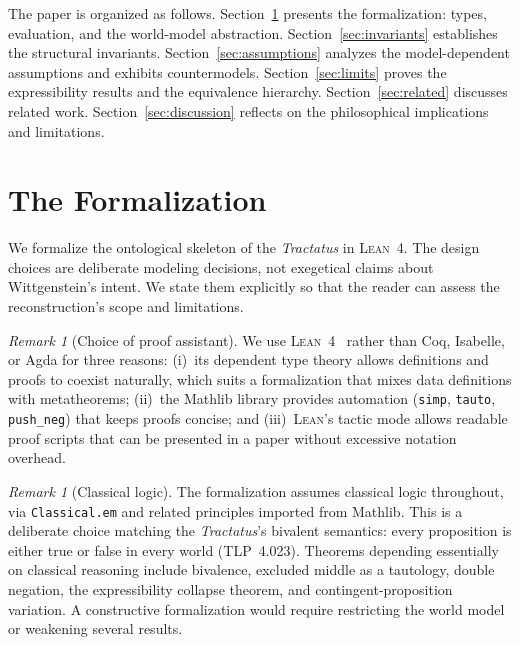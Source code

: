 \documentclass[10pt, letterpaper]{article}
\theoremstyle{definition}
\theoremstyle{remark}
\newtheorem{remark}[theorem]{Remark}
\newcommand{\Lean}{\textsc{Lean}}
\begin{document}
The paper is organized as follows.
Section~\ref{sec:formalization} presents the formalization:
types, evaluation, and the world-model abstraction.
Section~\ref{sec:invariants} establishes the structural
invariants.
Section~\ref{sec:assumptions} analyzes the model-dependent
assumptions and exhibits countermodels.
Section~\ref{sec:limits} proves the expressibility results and
the equivalence hierarchy.
Section~\ref{sec:related} discusses related work.
Section~\ref{sec:discussion} reflects on the philosophical
implications and limitations.

\section{The Formalization}
\label{sec:formalization}

We formalize the ontological skeleton of the \emph{Tractatus}
in \Lean~4.  The design choices are deliberate modeling
decisions, not exegetical claims about Wittgenstein's intent.
We state them explicitly so that the reader can assess the
reconstruction's scope and limitations.

\begin{remark}[Choice of proof assistant]
\label{rem:lean4}
We use \Lean~4~\cite{moura2021} rather than Coq, Isabelle, or
Agda for three reasons: (i)~its dependent type theory allows
definitions and proofs to coexist naturally, which suits a
formalization that mixes data definitions with metatheorems;
(ii)~the Mathlib library provides automation
(\texttt{simp}, \texttt{tauto}, \texttt{push\_neg}) that keeps
proofs concise; and (iii)~\Lean's tactic mode allows readable
proof scripts that can be presented in a paper without excessive
notation overhead.
\end{remark}

\begin{remark}[Classical logic]
\label{rem:classical}
The formalization assumes classical logic throughout, via
\texttt{Classical.em} and related principles imported from
Mathlib.  This is a deliberate choice matching the
\emph{Tractatus}'s bivalent semantics: every proposition is
either true or false in every world (TLP~4.023).
Theorems depending essentially on classical reasoning include
bivalence, excluded middle as a tautology, double negation,
the expressibility collapse theorem, and contingent-proposition
variation.  A constructive formalization would require
restricting the world model or weakening several results.
\end{remark}
\end{document}
